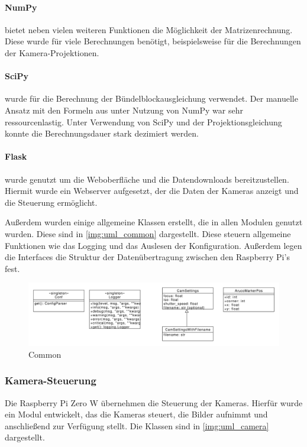 \documentclass[./00PhotoBox.tex]{subfiles}
\begin{document}
\paragraph{NumPy}
bietet neben vielen weiteren Funktionen die Möglichkeit der Matrizenrechnung. Diese wurde für viele Berechnungen benötigt, beispielsweise für die Berechnungen der Kamera-Projektionen.

\paragraph{SciPy}
wurde für die Berechnung der Bündelblockausgleichung verwendet. Der manuelle Ansatz mit den Formeln aus \cite{luhmann} unter Nutzung von NumPy war sehr ressourcenlastig. Unter Verwendung von SciPy und der Projektionsgleichung konnte die Berechnungsdauer stark dezimiert werden.

\paragraph{Flask}
wurde genutzt um die Weboberfläche und die Datendownloads bereitzustellen. Hiermit wurde ein Webserver aufgesetzt, der die Daten der Kameras anzeigt und die Steuerung ermöglicht.

Außerdem wurden einige allgemeine Klassen erstellt, die in allen Modulen genutzt wurden. Diese sind in \autoref{img:uml_common} dargestellt. Diese steuern allgemeine Funktionen wie das Logging und das Auslesen der Konfiguration. Außerdem legen die Interfaces die Struktur der Datenübertragung zwischen den Raspberry Pi's fest.

\begin{figure}
    \centering
    \includegraphics[width=1\textwidth]{./img/uml/uml_common_classdiagramm.pdf}
    \centering
    \caption{Common} %
    \label{img:uml_common} %
\end{figure}

\subsubsection{Kamera-Steuerung}
Die Raspberry Pi Zero W übernehmen die Steuerung der Kameras. Hierfür wurde ein Modul entwickelt, das die Kameras steuert, die Bilder aufnimmt und anschließend zur Verfügung stellt. Die Klassen sind in \autoref{img:uml_camera} dargestellt.
\end{document}
